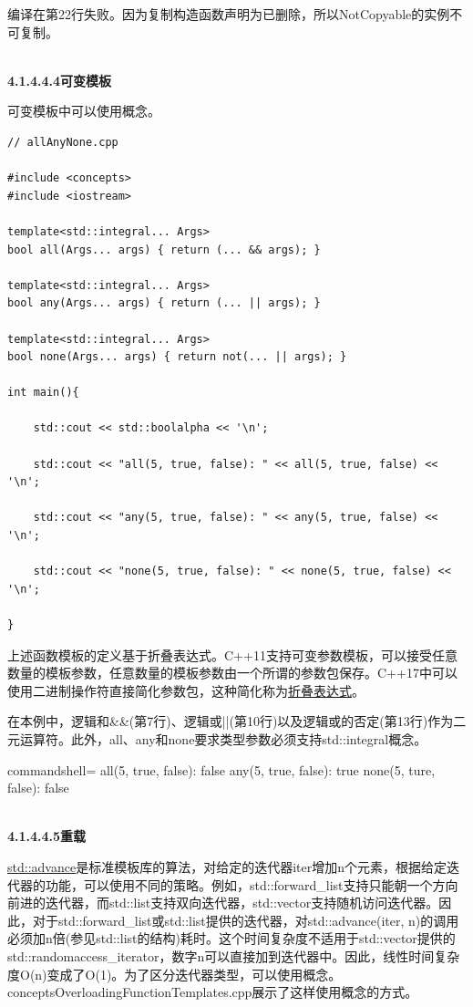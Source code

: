 编译在第22行失败。因为复制构造函数声明为已删除，所以NotCopyable的实例不可复制。

\hspace*{\fill} \\ %
\noindent
\textbf{4.1.4.4.4\hspace{0.2cm}可变模板}

可变模板中可以使用概念。

\begin{lstlisting}[style=styleCXX]
// allAnyNone.cpp

#include <concepts>
#include <iostream>

template<std::integral... Args>
bool all(Args... args) { return (... && args); }

template<std::integral... Args>
bool any(Args... args) { return (... || args); }

template<std::integral... Args>
bool none(Args... args) { return not(... || args); }

int main(){

	std::cout << std::boolalpha << '\n';

	std::cout << "all(5, true, false): " << all(5, true, false) << '\n';

	std::cout << "any(5, true, false): " << any(5, true, false) << '\n';

	std::cout << "none(5, true, false): " << none(5, true, false) << '\n';

}
\end{lstlisting}

上述函数模板的定义基于折叠表达式。C++11支持可变参数模板，可以接受任意数量的模板参数，任意数量的模板参数由一个所谓的参数包保存。C++17中可以使用二进制操作符直接简化参数包，这种简化称为\href{https://www.modernescpp.com/index.php/fold-expressions}{折叠表达式}。

在本例中，逻辑和\&\&(第7行)、逻辑或||(第10行)以及逻辑或的否定(第13行)作为二元运算符。此外，all、any和none要求类型参数必须支持std::integral概念。

\begin{tcblisting}{commandshell={}}
all(5, true, false): false
any(5, true, false): true
none(5, ture, false): false
\end{tcblisting}

\hspace*{\fill} \\ %
\noindent
\textbf{4.1.4.4.5\hspace{0.2cm}重载}

\href{https://en.cppreference.com/w/cpp/iterator/advance}{std::advance}是标准模板库的算法，对给定的迭代器iter增加n个元素，根据给定迭代器的功能，可以使用不同的策略。例如，std::forward\_list支持只能朝一个方向前进的迭代器，而std::list支持双向迭代器，std::vector支持随机访问迭代器。因此，对于std::forward\_list或std::list提供的迭代器，对std::advance(iter, n)的调用必须加n倍(参见std::list的结构)耗时。这个时间复杂度不适用于std::vector提供的std::randomaccess\_iterator，数字n可以直接加到迭代器中。因此，线性时间复杂度O(n)变成了O(1)。为了区分迭代器类型，可以使用概念。conceptsOverloadingFunctionTemplates.cpp展示了这样使用概念的方式。

